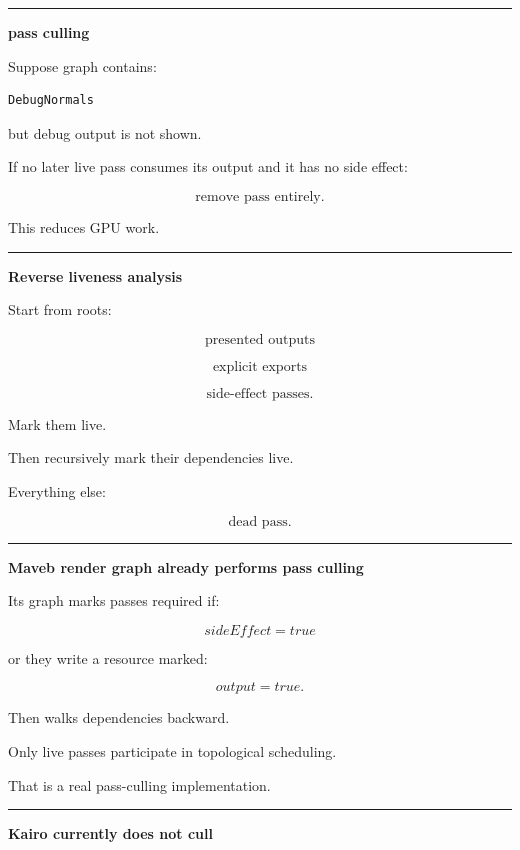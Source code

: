 \begin{center}\rule{0.5\linewidth}{0.5pt}\end{center}

\textbf{pass culling}

Suppose graph contains:

\begin{verbatim}
DebugNormals
\end{verbatim}

but debug output is not shown.

If no later live pass consumes its output and it has no side effect:

\[
\boxed{
\text{remove pass entirely}.
}
\]

This reduces GPU work.

\begin{center}\rule{0.5\linewidth}{0.5pt}\end{center}

\textbf{Reverse liveness analysis}

Start from roots:

\[
\text{presented outputs}
\]

\[
\text{explicit exports}
\]

\[
\text{side-effect passes}.
\]

Mark them live.

Then recursively mark their dependencies live.

Everything else:

\[
\boxed{\text{dead pass}.}
\]

\begin{center}\rule{0.5\linewidth}{0.5pt}\end{center}

\textbf{Maveb render graph already performs pass culling}

Its graph marks passes required if:

\[
sideEffect=true
\]

or they write a resource marked:

\[
output=true.
\]

Then walks dependencies backward.

Only live passes participate in topological scheduling.

That is a real pass-culling implementation.

\begin{center}\rule{0.5\linewidth}{0.5pt}\end{center}

\textbf{Kairo currently does not cull}

